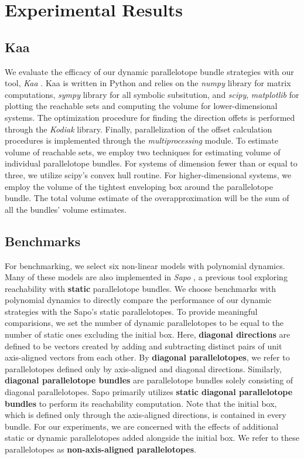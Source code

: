 \chapter{Experimental Results}
\section{Kaa}
\label{sec:kaa}
We evaluate the efficacy of our dynamic parallelotope bundle strategies with our tool, \emph{Kaa} \cite{kim2020kaa}. Kaa is written in Python and relies on the \emph{numpy} library for matrix computations, \emph{sympy} library for all symbolic subsitution, and \emph{scipy}, \emph{matplotlib} for plotting the reachable sets and computing the volume for lower-dimensional systems. The optimization procedure for finding the direction offets is performed through the \emph{Kodiak} library. Finally, parallelization of the offset calculation procedures is implemented through the \emph{multiprocessing} module. To estimate volume of reachable sets, we employ two techniques for estimating volume of individual parallelotope bundles. For systems of dimension fewer than or equal to three, we utilize scipy's convex hull routine.
%
For higher-dimensional systems, we employ the volume of the tightest enveloping box around the parallelotope bundle.
%
The total volume estimate of the overapproximation will be the sum of all the bundles' volume estimates.
\section{Benchmarks}
\label{sec:benchmarks}
For benchmarking, we select six non-linear models with polynomial dynamics.
%
Many of these models are also implemented in \emph{Sapo} \cite{dreossi2017sapo}, a previous tool exploring reachability with {\bf static} parallelotope bundles.
%
We choose benchmarks with polynomial dynamics to directly compare the performance of our dynamic strategies with the Sapo's static parallelotopes. To provide meaningful comparisions, we set the number of dynamic parallelotopes to be equal to the number of static ones excluding the initial box. Here, {\bf diagonal directions} are defined to be vectors created by adding and subtracting distinct pairs of unit axis-aligned vectors from each other.
%
By {\bf diagonal parallelotopes}, we refer to parallelotopes defined only by axis-aligned and diagonal directions. Similarly, {\bf diagonal parallelotope bundles} are parallelotope bundles solely consisting of diagonal parallelotopes. Sapo primarily utilizes {\bf static diagonal parallelotope bundles} to perform its reachability computation.
Note that the initial box, which is defined only through the axis-aligned directions, is contained in every bundle.
%
For our experiments, we are concerned with the effects of additional static or dynamic parallelotopes added alongside the initial box. We refer to these parallelotopes as {\bf non-axis-aligned parallelotopes}.

